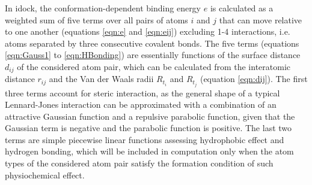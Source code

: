 \documentclass[a4paper,12pt]{article}
\begin{document}
In idock, the conformation-dependent binding energy $e$ is calculated as a weighted sum of five terms over all pairs of atoms $i$ and $j$ that can move relative to one another (equations \eqref{eqn:e} and \eqref{eqn:eij}) excluding 1-4 interactions, i.e. atoms separated by three consecutive covalent bonds. The five terms (equations \eqref{eqn:Gauss1} to \eqref{eqn:HBonding}) are essentially functions of the surface distance $d_{ij}$ of the considered atom pair, which can be calculated from the interatomic distance $r_{ij}$ and the Van der Waals radii $R_{t_i}$ and $R_{t_j}$ (equation \eqref{eqn:dij}). The first three terms account for steric interaction, as the general shape of a typical Lennard-Jones interaction can be approximated with a combination of an attractive Gaussian function and a repulsive parabolic function, given that the Gaussian term is negative and the parabolic function is positive. The last two terms are simple piecewise linear functions assessing hydrophobic effect and hydrogen bonding, which will be included in computation only when the atom types of the considered atom pair satisfy the formation condition of such physiochemical effect.
\end{document}
